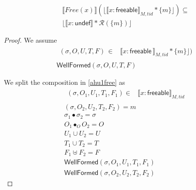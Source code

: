  \begin{lemma}
   \label{lemma:free}
\begin{align*}
  \llbracket Free(x) \rrbracket (\lfloor \llbracket x:\textsf{freeable} \rrbracket_{M,tid} * \{m\}\rfloor)  \subseteq \\
                                                              \lfloor \llbracket x:\textsf{undef} \rrbracket  * \mathcal{R}(\{m\})\rfloor
\end{align*}
 \end{lemma}
 \begin{proof}
We assume
\begin{gather}\label{ahu1free}
  \begin{aligned}
    (\sigma, O, U, T,F) \, \in &  \llbracket x:\textsf{freeable} \, \rrbracket_{M,tid} * \{m\}\rfloor) 
    \end{aligned} \\
\textsf{WellFormed}(\sigma,O,U,T,F)
\label{ahu2free}
\end{gather}

We split the composition in  \ref{ahu1free} as 
\begin{gather} \label{ahu11free}
  \begin{aligned}
    (\sigma, O_{1}, U_{1}, T_{1},F_1 ) \in & \llbracket  x:\textsf{freeable}  \rrbracket_{M,tid}  \end{aligned}\\
  \label{ahu12free}
(\sigma, O_{2}, U_{2}, T_{2},F_2) = m
  \\
  \label{ahufreesig}
  \sigma_1 \bullet \sigma_2 = \sigma
  \\
\label{ahu13free}
O_{1} \bullet_{O} O_{2} = O
\\
\label{ahu14free}
U_{1} \cup U_{2} = U
\\
\label{ahu15free}
T_{1} \cup T_{2} = T
\\
\label{ahufreeF}
F_1 \uplus F_2 = F
\\
\label{ahu16free}
\textsf{WellFormed}(\sigma,O_{1},U_{1},T_{1},F_1)
\\
\label{ahu17free}
\textsf{WellFormed}(\sigma,O_{2},U_{2},T_{2},F_2)
\end{gather}


\end{proof}

